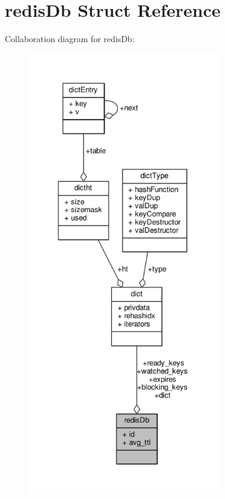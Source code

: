 \hypertarget{structredisDb}{}\section{redis\+Db Struct Reference}
\label{structredisDb}


Collaboration diagram for redis\+Db\+:\nopagebreak
\begin{figure}[H]
\begin{center}
\leavevmode
\includegraphics[height=550pt]{structredisDb__coll__graph}
\end{center}
\end{figure}
